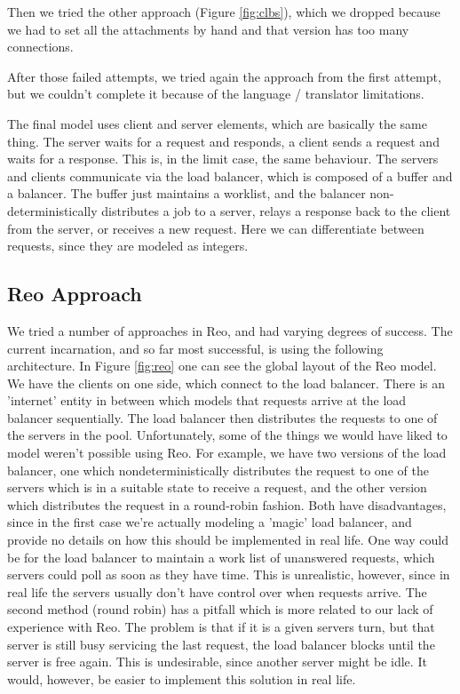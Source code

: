 \documentclass[a4paper]{article}
\newcommand{\re}{Reo\xspace}
\begin{document}
Then we tried the other approach (Figure \ref{fig:clbs}), which we dropped because we had to set all
the attachments by hand and that version has too many connections.

After those failed attempts, we tried again the approach from the first
attempt, but we couldn't complete it because of the language / translator
limitations.

The final model uses client and server elements, which are basically the same
thing. The server waits for a request and responds, a client sends a request and
waits for a response. This is, in the limit case, the same behaviour. The
servers and clients communicate via the load balancer, which is composed of a
buffer and a balancer. The buffer just maintains a worklist, and the balancer
non-deterministically distributes a job to a server, relays a response back to
the client from the server, or receives a new request. Here we can differentiate
between requests, since they are modeled as integers. 


\subsection{\re Approach}

We tried a number of approaches in \re, and had varying degrees of success. The
current incarnation, and so far most successful, is using the following
architecture. In Figure \ref{fig:reo} one can see the global layout of the \re
model. We have the clients on one side, which connect to the load balancer.
There is an 'internet' entity in between which models that requests arrive at
the load balancer sequentially. The load balancer then distributes the requests
to one of the servers in the pool. Unfortunately, some of the things we would
have liked to model weren't possible using \re. For example, we have two
versions of the load balancer, one which nondeterministically distributes the
request to one of the servers which is in a suitable state to receive a request,
and the other version which distributes the request in a round-robin fashion.
Both have disadvantages, since in the first case we're actually modeling a
'magic' load balancer, and provide no details on how this should be implemented
in real life. One way could be for the load balancer to maintain a work list of
unanswered requests, which servers could poll as soon as they have time. This is
unrealistic, however, since in real life the servers usually don't have control
over when requests arrive. The second method (round robin) has a pitfall which
is more related to our lack of experience with \re. The problem is that if it is a
given servers turn, but that server is still busy servicing the last request,
the load balancer blocks until the server is free again. This is undesirable,
since another server might be idle. It would, however, be easier to implement
this solution in real life.
\end{document}
